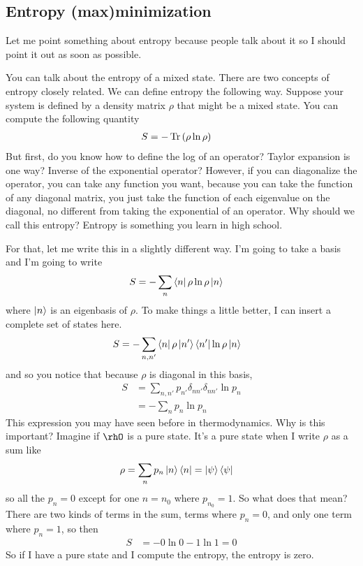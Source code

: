 \subsection{Entropy (max)minimization}
Let me point something about entropy because people talk about it so I should
point it out as soon as possible.

You can talk about the entropy of a mixed state.
There are two concepts of entropy closely related.
We can define entropy the following way.
Suppose your system is defined by a density matrix $\rho$
that might be a mixed state.
You can compute the following quantity
\begin{align}
    S &= - \Tr \left( \rho \ln \rho \right)
\end{align}
But first,
do you know how to define the log of an operator?
Taylor expansion is one way?
Inverse of the exponential operator?
However,
if you can diagonalize the operator,
you can take any function you want,
because you can take the function of any diagonal matrix,
you just take the function of each eigenvalue on the diagonal,
no different from taking the exponential of an operator.
Why should we call this entropy?
Entropy is something you learn in high school.

For that,
let me write this in a slightly different way.
I'm going to take a basis and I'm going to write
\begin{align}
    S &=
    - \sum_n
    \bra{n} \rho \ln\rho \ket{n}
\end{align}
where $\ket{n}$ is an eigenbasis of $\rho$.
To make things a little better,
I can insert a complete set of states here.
\begin{align}
    S &=
    - \sum_{n,n'}
    \bra{n} \rho \ket{n'}\bra{n'}\ln\rho \ket{n}
\end{align}
and so you notice that because $\rho$ is diagonal in this basis,
\begin{align}
    S &= \sum_{n,n'} p_{n'}\delta_{nn'} \delta_{nn'}\ln p_n\\
    &= - \sum_n p_n \ln p_n
\end{align}
This expression you may have seen before in thermodynamics.
Why is this important?
Imagine if $\rhO$ is a pure state.
It's a pure state when I write $\rho$ as a sum like
\begin{align}
    \rho &= \sum_n p_n \ket{n}\bra{n} = \ket{\psi}\bra{\psi}
\end{align}
so all the $p_n=0$ except for one $n=n_0$ where $p_{n_0}=1$.
So what does that mean?
There are two kinds of terms in the sum,
terms where $p_n=0$,
and only one term where $p_n=1$,
so then
\begin{align}
    S &= - 0 \ln 0 - 1\ln 1 = 0
\end{align}
So if I have a pure state
and I compute the entropy,
the entropy is zero.


